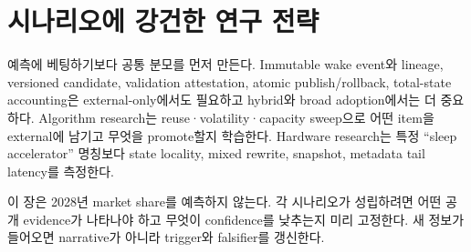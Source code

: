 \section{시나리오에 강건한 연구 전략}

예측에 베팅하기보다 공통 분모를 먼저 만든다. Immutable wake event와 lineage, versioned candidate,
validation attestation, atomic publish/rollback, total-state accounting은 external-only에서도 필요하고
hybrid와 broad adoption에서는 더 중요하다. Algorithm research는 reuse·volatility·capacity sweep으로
어떤 item을 external에 남기고 무엇을 promote할지 학습한다. Hardware research는 특정 ``sleep
accelerator'' 명칭보다 state locality, mixed rewrite, snapshot, metadata tail latency를 측정한다.

\begin{cautionbox}
이 장은 2028년 market share를 예측하지 않는다. 각 시나리오가 성립하려면 어떤 공개 evidence가
나타나야 하고 무엇이 confidence를 낮추는지 미리 고정한다. 새 정보가 들어오면 narrative가 아니라
trigger와 falsifier를 갱신한다.
\end{cautionbox}
